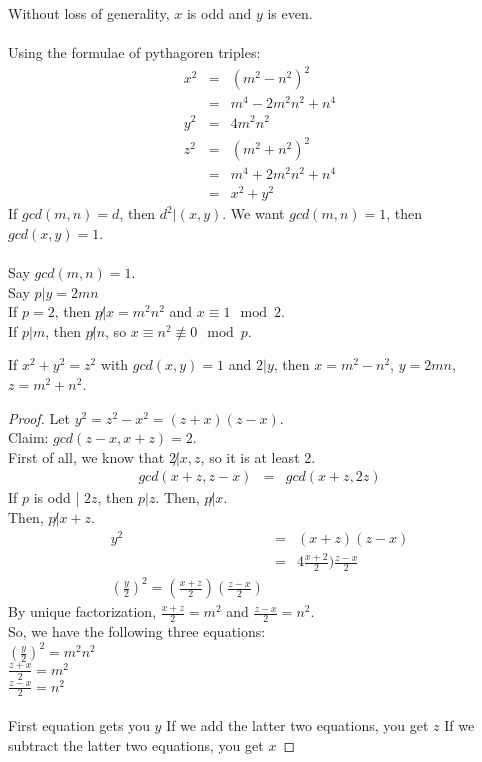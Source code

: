       Without loss of generality, $x$ is odd and $y$ is even.\\\\
      Using the formulae of pythagoren triples:\\
      \begin{eqnarray*}
        x^2 & = & (m^2 - n^2)^2\\
        & = & m^4 - 2m^2n^2 + n^4\\
        y^2 & = & 4m^2n^2\\
        z^2 & = & (m^2+n^2)^2\\
        & = & m^4 + 2m^2n^2 + n^4\\
        & = & x^2 + y^2
      \end{eqnarray*}
      If $gcd(m,n) = d$, then $d^2 | (x,y)$. We want $gcd(m,n) = 1$, then
      $gcd(x,y) = 1$.\\\\
      Say $gcd(m,n) = 1$.\\
      Say $p |y = 2mn$\\
      If $p = 2$, then $p \not| x = m^2 n^2$ and $x \equiv 1 \mod 2$.\\
      If $p | m$, then $p \not| n$, so $x \equiv n^2 \not\equiv 0 \mod p$.\\
    \begin{theorem}
      If $x^2 + y^2 = z^2$ with $gcd(x,y) = 1$ and $2 | y$, then
        $x = m^2 - n^2$, $y = 2mn$, $z = m^2 + n^2$.
    \end{theorem}
    \begin{proof}
      Let $y^2 = z^2 - x^2 = (z + x)(z - x)$.\\
      Claim: $gcd(z - x,x+z) = 2$.\\
      First of all, we know that $2\not| x,z$, so it is at least 2.\\
      \begin{eqnarray*}
        gcd(x + z, z - x) & = & gcd(x + z, 2z)
      \end{eqnarray*}
      If $p$ is odd | $2z$, then $p | z$. Then, $p \not| x$.\\
      Then, $p \not| x + z$.\\
      \begin{eqnarray*}
        y^2 & = & (x + z)(z - x)\\
        & = & 4\frac{x+2}{2})\frac{z-x}{2}\\
        (\frac{y}{2})^2 = (\frac{x + z}{2})(\frac{z - x}{2})
      \end{eqnarray*}
      By unique factorization, $\frac{x + z}{2} = m^2$ and $\frac{z-x}{2} = 
      n^2$.\\
      So, we have the following three equations:\\
      $(\frac{y}{2})^2 = m^2n^2$\\
      $\frac{z + x}{2} = m^2$\\
      $\frac{z - x}{2} = n^2$\\\\
      First equation gets you $y$
      If we add the latter two equations, you get $z$
      If we subtract the latter two equations, you get $x$
    \end{proof}

